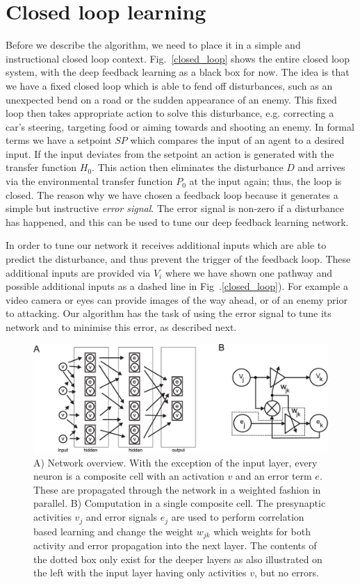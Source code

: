 \documentclass[Afour,sageh,times]{sagej}
\begin{document}
\section{Closed loop learning}
Before we describe the algorithm, we need to place it in a simple and
instructional closed loop context. Fig.~\ref{closed_loop} shows the
entire closed loop system, with the deep feedback learning as a black
box for now. The idea is that we have a fixed closed loop which is
able to fend off disturbances, such as an unexpected bend on a road or
the sudden appearance of an enemy. This fixed loop then takes
appropriate action to solve this disturbance, e.g. correcting a car's
steering, targeting food or aiming towards and shooting an enemy. In
formal terms we have a setpoint $SP$ which compares the input of an
agent to a desired input. If the input deviates from the setpoint an
action is generated with the transfer function $H_0$. This action then
eliminates the disturbance $D$ and arrives via the environmental
transfer function $P_0$ at the input again; thus, the loop is
closed. The reason why we have chosen a feedback loop because it
generates a simple but instructive \textsl{error signal}. The error
signal is non-zero if a disturbance has happened, and this can be used
to tune our deep feedback learning network.

In order to tune our network it receives additional inputs which are
able to predict the disturbance, and thus prevent the trigger of the
feedback loop. These additional inputs are provided via $V_i$ where we
have shown one pathway and possible additional inputs as a dashed line
in Fig~.\ref{closed_loop}). For example a video camera or eyes can
provide images of the way ahead, or of an enemy prior to
attacking. Our algorithm has the task of using the error signal to
tune its network and to minimise this error, as described next.

\begin{figure}[!ht]
  \centering
  \includegraphics[width=\columnwidth]{netw_together}
  \caption{A) Network overview. With the exception of the input layer, every
    neuron is a composite cell with an activation $v$ and an error
    term $e$. These are propagated through the network in a weighted
    fashion in parallel.  B) Computation in a single composite cell.
    The presynaptic activities $v_j$ and error signals $e_j$ are used
    to perform correlation based learning and change the weight
    $w_{jk}$ which weights for both activity and error propagation into the next
    layer. The contents of the dotted box only exist for the deeper
    layers as also illustrated on the left with the input layer
    having only activities $v$, but no errors. \label{netw_together}}
\end{figure}
\end{document}
